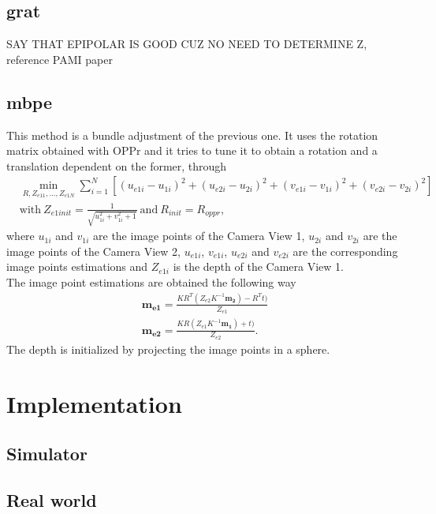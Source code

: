 \subsection{\acrlong{grat}}

SAY THAT EPIPOLAR IS GOOD CUZ NO NEED TO DETERMINE Z, reference PAMI paper

\subsection{\acrlong{mbpe}}
\label{MBaPE}
This method is a bundle adjustment of the previous one. It uses the rotation matrix obtained with OPPr and it tries to tune it to obtain a rotation and a translation dependent on the former, through 
\begin{align*}
	& \min_{R, Z_{e11}, ..., Z_{e1N}} \sum^N_{i=1} [(u_{e1i}-u_{1i})^2 + (u_{e2i}-u_{2i})^2 + (v_{e1i}-v_{1i})^2 + (v_{e2i}-v_{2i})^2]\\
	& \text{with} \ Z_{e1init} = \frac{1}{\sqrt{u_{1i}^2 + v_{1i}^2 + 1}} \ \text{and} \ R_{init} = R_{oppr},
\end{align*}
where $u_{1i}$ and $v_{1i}$ are the image points of the Camera View 1, $u_{2i}$ and $v_{2i}$ are the image points of the Camera View 2, $u_{e1i}$, $v_{e1i}$, $u_{e2i}$ and $v_{e2i}$ are the corresponding image points estimations and $Z_{e1i}$ is the depth of the Camera View 1.\\
The image point estimations are obtained the following way
\begin{align*}
	\mathbf{m_{e1}} = \frac{KR^T(Z_{e2}K^{-1}\mathbf{m_2}) - R^Tt)}{Z_{e1}}\\
	\mathbf{m_{e2}} = \frac{KR(Z_{e1}K^{-1}\mathbf{m_1}) + t)}{Z_{e2}}.
\end{align*} The depth is initialized by projecting the image points in a sphere.

\section{Implementation}

\subsection{Simulator}

\subsection{Real world}
